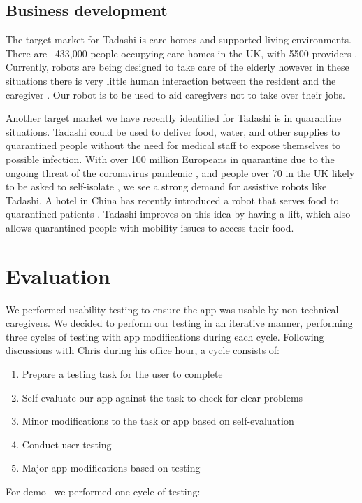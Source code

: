 \documentclass{article}
\begin{document}
\subsection{Business development}
The target market for Tadashi is care homes and supported living environments. There are ~433,000 people occupying care homes in the UK, with 5500 providers \cite{carehomes}. Currently, robots are being designed to take care of the elderly however in these situations there is very little human interaction between the resident and the caregiver \cite{robotcarers}. Our robot is to be used to aid caregivers not to take over their jobs.

Another target market we have recently identified for Tadashi is in quarantine situations. Tadashi could be used to deliver food, water, and other supplies to quarantined people without the need for medical staff to expose themselves to possible infection. With over 100 million Europeans in quarantine due to the ongoing threat of the coronavirus pandemic \cite{quarantine}, and people over 70 in the UK likely to be asked to self-isolate \cite{isolate}, we see a strong demand for assistive robots like Tadashi. A hotel in China has recently introduced a robot that serves food to quarantined patients \cite{peanut}. Tadashi improves on this idea by having a lift, which also allows quarantined people with mobility issues to access their food.

\section{Evaluation}
We performed usability testing to ensure the app was usable by non-technical caregivers. We decided to perform our testing in an iterative manner, performing three cycles of testing with app modifications during each cycle. Following discussions with Chris during his office hour, a cycle consists of:
\begin{enumerate}
  \item Prepare a testing task for the user to complete
  \item Self-evaluate our app against the task to check for clear problems
  \item Minor modifications to the task or app based on self-evaluation
  \item Conduct user testing
  \item Major app modifications based on testing
\end{enumerate}

For demo \demoNumber\ we performed one cycle of testing:
\end{document}
